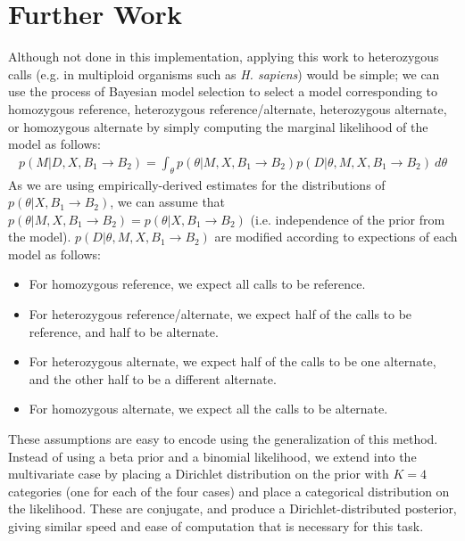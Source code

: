 \documentclass[10pt,letterpaper]{article}
\begin{document}
\section{Further Work}

\par Although not done in this implementation, applying this work to heterozygous calls (e.g. in multiploid organisms such as \textit{H. sapiens}) would be simple; we can use the process of Bayesian model selection
to select a model corresponding to homozygous reference, heterozygous reference/alternate, heterozygous alternate, or homozygous alternate by simply computing the marginal likelihood of the model as follows:
\begin{equation}
\begin{aligned}
 p (M | D, X, B_1 \rightarrow B_2) = \int_\theta p(\theta | M, X, B_1 \rightarrow B_2) p(D | \theta, M, X, B_1 \rightarrow B_2) \ d\theta
\end{aligned}
\end{equation}
As we are using empirically-derived estimates for the distributions of $p(\theta | X, B_1 \rightarrow B_2)$, we can assume that $p(\theta | M, X, B_1 \rightarrow B_2) = p(\theta | X, B_1 \rightarrow B_2)$
(i.e. independence of the prior from the model).
$p(D | \theta, M, X, B_1 \rightarrow B_2)$ are modified according to expections of each model as follows:
\begin{itemize}
    \item For homozygous reference, we expect all calls to be reference.
    \item For heterozygous reference/alternate, we expect half of the calls to be reference, and half to be alternate.
    \item For heterozygous alternate, we expect half of the calls to be one alternate, and the other half to be a different alternate.
    \item For homozygous alternate, we expect all the calls to be alternate.
\end{itemize}
These assumptions are easy to encode using the generalization of this method. Instead of using a beta prior and a binomial likelihood, we extend into the multivariate case by placing a Dirichlet distribution on the
prior with $K = 4$ categories (one for each of the four cases) and place a categorical distribution on the likelihood. These are conjugate, and produce a Dirichlet-distributed posterior, giving similar speed and ease
of computation that is necessary for this task.
\end{document}

